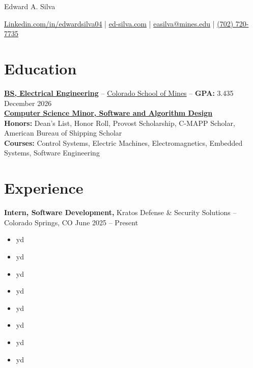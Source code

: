 \documentclass[11pt]{article}       %
\begin{document}
\centerline{\huge Edward A. Silva}
\vspace{5pt}

\centerline{
\href{https://www.linkedin.com/in/edwardsilva04/}{Linkedin.com/in/edwardsilva04}
| \href{https://ed-silva.com}{ed-silva.com}
| \href{mailto:easilva@mines.edu}{easilva@mines.edu} 
| \href{tel:7027207735}{(702) 720-7735}
}

\vspace{-18pt}
\section*{Education}
\textbf{\href{https://electrical.mines.edu/undergraduate-program/}{BS, Electrical Engineering}} -- \href{https://www.mines.edu/}{Colorado School of Mines} -- \textbf{GPA:} 3.435 \hfill December 2026 \\
\textbf{\href{https://cs.mines.edu/csmines-minors-and-areas-of-special-interest/}{Computer Science Minor, Software and Algorithm Design}}\\

\textbf{Honors:} Dean's List, Honor Roll, Provost Scholarship, C-MAPP Scholar, American Bureau of Shipping Scholar \\ 
\textbf{Courses:} Control Systems, Electric Machines, Electromagnetics, Embedded Systems, Software Engineering
\vspace{-14pt}

\section*{Experience}

\textbf{Intern, Software Development, }{Kratos Defense \& Security Solutions} -- Colorado Springs, CO \hfill June 2025 -- Present \\
\vspace{-6.5pt}
\begin{itemize}
  \item yd
  \item yd
  \item yd
  \item yd
  \item yd
  \item yd
  \item yd
  \item yd
\end{itemize}
\end{document}
